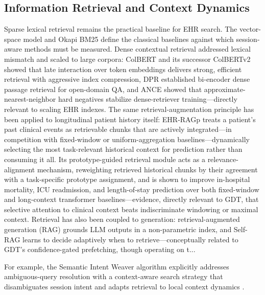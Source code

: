 \documentclass[11pt]{article}
\begin{document}
\subsection{Information Retrieval and Context Dynamics}
Sparse lexical retrieval remains the practical baseline for EHR search. The vector-space model \citep{salton83} and Okapi BM25 \citep{robertson1995,robertson1976} define the classical baselines against which session-aware methods must be measured. Dense contextual retrieval addressed lexical mismatch and scaled to large corpora: ColBERT \citep{khattab20} and its successor ColBERTv2 \citep{santhanam2022_colbertv2} showed that late interaction over token embeddings delivers strong, efficient retrieval with aggressive index compression, DPR \citep{karpukhin2020_dpr} established bi-encoder dense passage retrieval for open-domain QA, and ANCE \citep{xiong2021_ance} showed that approximate-nearest-neighbor hard negatives stabilize dense-retriever training---directly relevant to scaling EHR indexes. The same retrieval-augmentation principle has been applied to longitudinal patient history itself: EHR-RAGp \citep{shurrab2026_ehrragp} treats a patient's past clinical events as retrievable chunks that are actively integrated---in competition with fixed-window or uniform-aggregation baselines---dynamically selecting the most task-relevant historical context for prediction rather than consuming it all. Its prototype-guided retrieval module acts as a relevance-alignment mechanism, reweighting retrieved historical chunks by their agreement with a task-specific prototype assignment, and is shown to improve in-hospital mortality, ICU readmission, and length-of-stay prediction over both fixed-window and long-context transformer baselines---evidence, directly relevant to GDT, that selective attention to clinical context beats indiscriminate windowing or maximal context. Retrieval has also been coupled to generation: retrieval-augmented generation (RAG) \citep{lewis2020_rag} grounds LLM outputs in a non-parametric index, and Self-RAG \citep{asai2024_selfrag} learns to decide adaptively when to retrieve---conceptually related to GDT's confidence-gated prefetching, though operating on t...

For example, the Semantic Intent Weaver algorithm explicitly addresses ambiguous-query resolution with a context-aware search strategy that disambiguates session intent and adapts retrieval to local context dynamics \citep{papachappa2026_siweaver}.
\end{document}
